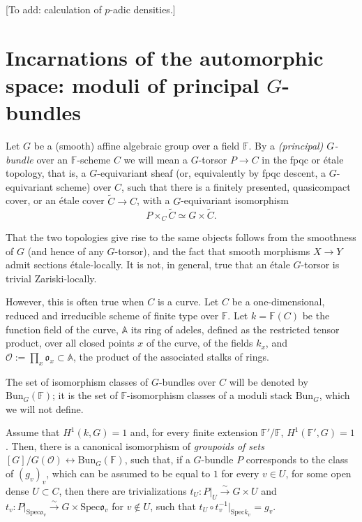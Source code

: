 [To add: calculation of $p$-adic densities.]




\section{Incarnations of the automorphic space: moduli of principal $G$-bundles}
\label{section-BunG}


Let $G$ be a (smooth) affine algebraic group over a field $\mathbb F$. 
By a \emph{(principal) $G$-bundle} over an $\mathbb F$-scheme $C$ we will mean a $G$-torsor $P\to C$ in the fpqc or \'etale topology, that is, a $G$-equivariant sheaf (or, equivalently by fpqc descent, a $G$-equivariant scheme) over $C$, such that there is a finitely presented, quasicompact cover, or an \'etale cover  $\tilde C\to C$, with a $G$-equivariant isomorphism
$$ P\times_C \tilde C \simeq G \times \tilde C.$$

That the two topologies give rise to the same objects follows from the smoothness of $G$ (and hence of any $G$-torsor), and the fact that smooth morphisms $X\to Y$ admit sections \'etale-locally. It is not, in general, true that an \'etale $G$-torsor is trivial Zariski-locally.



However, this is often true when $C$ is a curve. Let $C$ be a one-dimensional, reduced and irreducible scheme of finite type over $\mathbb F$. Let $k = \mathbb F(C)$ be the function field of the curve, $\mathbb A$ its ring of adeles, defined as the restricted tensor product, over all closed points $x$ of the curve, of the fields $k_x$, and $\mathcal O:= \prod_x \mathfrak o_x\subset \mathbb A$, the product of the associated stalks of rings. 





The set of isomorphism classes of $G$-bundles over $C$ will be denoted by $\text{Bun}_G(\mathbb F)$; it is the set of $\mathbb F$-isomorphism classes of a moduli stack $\text{Bun}_G$, which we will not define.


\begin{proposition}
 \label{proposition-BunG}
Assume that $H^1(k,G)=1$ and, for every finite extension $\mathbb F'/\mathbb F$, $H^1(\mathbb F',G)=1$. Then, 
there is a canonical isomorphism of \emph{groupoids of sets} $[G]/G(\mathcal O) \leftrightarrow \text{Bun}_G(\mathbb F)$, such that, if a $G$-bundle $P$ corresponds to the class of $(g_v)_v$, which can be assumed to be equal to $1$ for every $v\in U$, for some open dense $U\subset C$, then there are trivializations $t_U: P|_U\xrightarrow\sim G\times U$ and $t_v: P|_{\text{Spec} \mathfrak o_v} \xrightarrow\sim G\times \text{Spec} \mathfrak o_v$ for $v\notin U$, such that $t_U \circ t_v^{-1}|_{\text{Spec} k_v} = g_v$.
\end{proposition}

